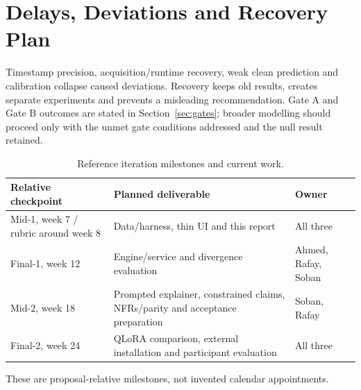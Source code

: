 \section{Delays, Deviations and Recovery Plan}
Timestamp precision, acquisition/runtime recovery, weak clean prediction and calibration collapse caused deviations. Recovery keeps old results, creates separate experiments and prevents a misleading recommendation. Gate A and Gate B outcomes are stated in Section~\ref{sec:gates}; broader modelling should proceed only with the unmet gate conditions addressed and the null result retained.
\begin{longtable}{p{}p{}p{}}
\caption{Reference iteration milestones and current work.}\label{tab:engineering-dates}\\\toprule Relative checkpoint & Planned deliverable & Owner\\\midrule
Mid-1, week 7 / rubric around week 8 & Data/harness, thin UI and this report & All three\\
Final-1, week 12 & Engine/service and divergence evaluation & Ahmed, Rafay, Soban\\
Mid-2, week 18 & Prompted explainer, constrained claims, NFRs/parity and acceptance preparation & Soban, Rafay\\
Final-2, week 24 & QLoRA comparison, external installation and participant evaluation & All three\\
\bottomrule\end{longtable}
These are proposal-relative milestones, not invented calendar appointments.
